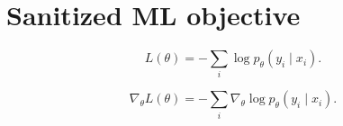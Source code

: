 \section{Sanitized ML objective}

\begin{equation}\label{eq:dept-ml-loss}
L(\theta) = -\sum_i \log p_\theta(y_i\mid x_i).
\end{equation}

\begin{equation}\label{eq:dept-ml-gradient}
\nabla_\theta L(\theta) = -\sum_i \nabla_\theta \log p_\theta(y_i\mid x_i).
\end{equation}
